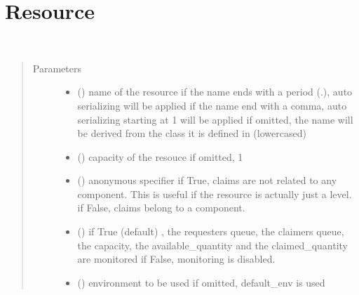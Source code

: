 \documentclass[letterpaper,10pt,english]{sphinxmanual}
\begin{document}
\section{Resource}
\label{\detokenize{Reference:resource}}

\begin{fulllineitems}
\label{\detokenize{Reference:salabim.Resource}}~\begin{quote}\begin{description}
\item[{Parameters}] \leavevmode\begin{itemize}
\item {} 
 () \textendash{} name of the resource 
if the name ends with a period (.),
auto serializing will be applied 
if the name end with a comma,
auto serializing starting at 1 will be applied 
if omitted, the name will be derived from the class
it is defined in (lowercased)

\item {} 
 () \textendash{} capacity of the resouce 
if omitted, 1

\item {} 
 () \textendash{} anonymous specifier 
if True, claims are not related to any component. This is useful
if the resource is actually just a level. 
if False, claims belong to a component.

\item {} 
 () \textendash{} if True (default) , the requesters queue, the claimers queue,
the capacity, the available\_quantity and the claimed\_quantity are monitored 
if False, monitoring is disabled.

\item {} 
 ({\hyperref[\detokenize{Reference:salabim.Environment}]{}}) \textendash{} environment to be used 
if omitted, default\_env is used


\end{itemize}
\end{description}
\end{quote}
\end{fulllineitems}
\end{document}
